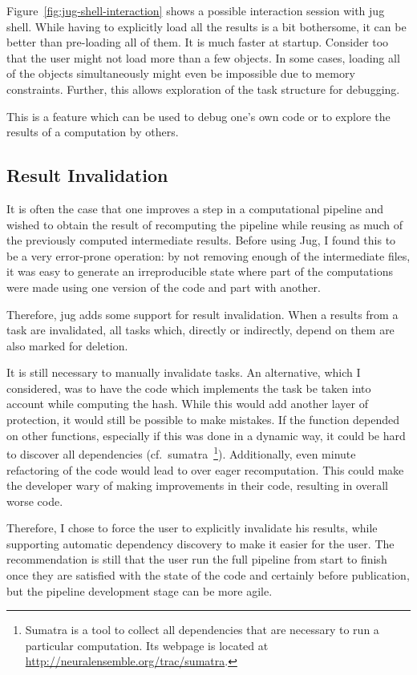 \documentclass{article}
\begin{document}
Figure~\ref{fig:jug-shell-interaction} shows a possible interaction session
with jug shell. While having to explicitly load all the results is a bit
bothersome, it can be better than pre-loading all of them. It is much faster at
startup. Consider too that the user might not load more than a few objects. In
some cases, loading all of the objects simultaneously might even be impossible
due to memory constraints. Further, this allows exploration of the task
structure for debugging.

This is a feature which can be used to debug one's own code or to explore the
results of a computation by others.

\subsection{Result Invalidation}

It is often the case that one improves a step in a computational pipeline and
wished to obtain the result of recomputing the pipeline while reusing as much
of the previously computed intermediate results. Before using Jug, I found this
to be a very error-prone operation: by not removing enough of the intermediate
files, it was easy to generate an irreproducible state where part of the
computations were made using one version of the code and part with another.

Therefore, jug adds some support for result invalidation. When a results from a
task are invalidated, all tasks which, directly or indirectly, depend on them
are also marked for deletion.

It is still necessary to manually invalidate tasks. An alternative, which I
considered, was to have the code which implements the task be taken into
account while computing the hash. While this would add another layer of
protection, it would still be possible to make mistakes. If the function
depended on other functions, especially if this was done in a dynamic way, it
could be hard to discover all dependencies (cf.\ sumatra~\footnote{Sumatra is a
tool to collect all dependencies that are necessary to run a particular
computation. Its webpage is located at
\url{http://neuralensemble.org/trac/sumatra}.}). Additionally, even minute
refactoring of the code would lead to over eager recomputation. This could make
the developer wary of making improvements in their code, resulting in overall
worse code.

Therefore, I chose to force the user to explicitly invalidate his results,
while supporting automatic dependency discovery to make it easier for the user.
The recommendation is still that the user run the full pipeline from start to
finish once they are satisfied with the state of the code and certainly before
publication, but the pipeline development stage can be more agile.
\end{document}
